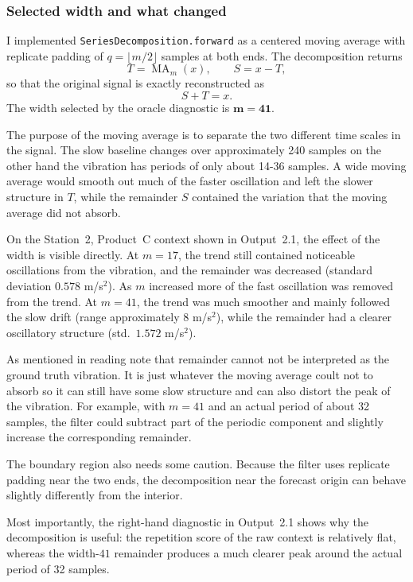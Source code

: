 \documentclass[a4, 12pt]{article}
\begin{document}
\subsubsection{ Selected width and what changed}

I implemented \texttt{SeriesDecomposition.forward} as a centered moving
average with replicate padding of $q=\lfloor m/2\rfloor$ samples at both
ends. The decomposition returns
\[
T=\operatorname{MA}_m(x), \qquad S=x-T,
\]
so that the original signal is exactly reconstructed as
\[
S+T=x.
\]
The width selected by the oracle diagnostic is
$\mathbf{m=41}$.

The purpose of the moving average is to separate the two different time
scales in the signal. The slow baseline changes over approximately
240 samples on the other hand the vibration has periods of only about 14-36
samples. A wide moving average would smooth out much of
the faster oscillation and left the slower structure in $T$, while the
remainder $S$ contained the variation that the moving average did not
absorb.

On the Station~2, Product~C context shown in Output~2.1, the effect of
the width is visible directly. At $m=17$, the trend still contained
noticeable oscillations from the vibration, and the remainder was
decreased (standard deviation $0.578$ m/s$^2$). As $m$ increased more of
the fast oscillation was removed from the trend. At $m=41$, the trend was
much smoother and mainly followed the slow drift (range approximately
$8$ m/s$^2$), while the remainder had a clearer oscillatory structure
(std.\ $1.572$ m/s$^2$).

As mentioned in reading note that remainder cannot not be interpreted as the ground truth vibration. It is just whatever the moving average coult not to absorb so it can still
have some slow structure and can also distort the peak of the
vibration. For example, with $m=41$ and an actual period of about
32 samples, the filter could subtract part of the periodic component and
slightly increase the corresponding remainder.

The boundary region also needs some caution. Because the filter uses
replicate padding near the two ends, the decomposition near the forecast
origin can behave slightly differently from the interior.

Most importantly, the right-hand diagnostic in Output~2.1 shows why the
decomposition is useful: the repetition score of the raw context is
relatively flat, whereas the width-$41$ remainder produces a much clearer
peak around the actual period of 32 samples.
\end{document}
